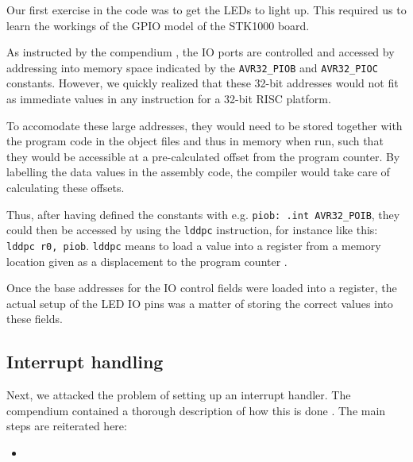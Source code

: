 Our first exercise in the code was to get the LEDs to light up. This
required us to learn the workings of the GPIO model of the STK1000
board.

As instructed by the compendium \cite{comp}, the IO ports are controlled
and accessed by addressing into memory space indicated by the
\texttt{AVR32\_PIOB} and \texttt{AVR32\_PIOC} constants. However, we
quickly realized that these 32-bit addresses would not fit as immediate
values in any instruction for a 32-bit RISC platform.

To accomodate these large addresses, they would need to be stored
together with the program code in the object files and thus in memory
when run, such that they would be accessible at a pre-calculated offset
from the program counter. By labelling the data values in the assembly
code, the compiler would take care of calculating these offsets.

Thus, after having defined the constants with e.g. \texttt{piob: .int
AVR32\_POIB}, they could then be accessed by using the \texttt{lddpc}
instruction, for instance like this: \texttt{lddpc r0, piob}.
\texttt{lddpc} means to load a value into a register from a memory
location given as a displacement to the program counter \cite{avr32}.

Once the base addresses for the IO control fields were loaded into a
register, the actual setup of the LED IO pins was a matter of storing
the correct values into these fields.

\subsection{Interrupt handling}

Next, we attacked the problem of setting up an interrupt handler. The
compendium contained a thorough description of how this is done
\cite{comp}. The main steps are reiterated here:

\begin{itemize}
    \item 
\end{itemize}




